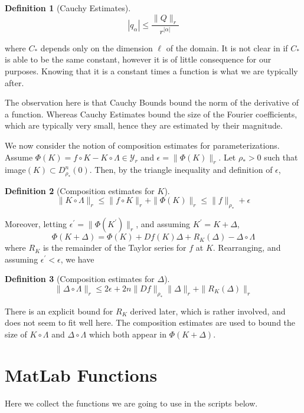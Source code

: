 \documentclass{article}
\newcommand{\Y}{\mathcal{Y}}
\theoremstyle{plain}
\newtheorem*{dfn}{Definition}
\theoremstyle{remark}
\begin{document}
\begin{dfn}[Cauchy Estimates]
\[
|q_\alpha| \leq \frac{\| Q \|_r}{r^{|\alpha|}}
\]
\end{dfn}

where $C_*$ depends only on the dimension $\ell$ of the domain. 
It is not clear in \cite{parampaper} if $C_*$ is able to be the same constant, however it is of little consequence for our purposes. 
Knowing that it is a constant times a function is what we are typically after. 

The observation here is that Cauchy Bounds bound the norm of the derivative of a function. 
Whereas Cauchy Estimates bound the size of the Fourier coefficients, which are typically very small, hence they are estimated by their magnitude. 

We now consider the notion of composition estimates for parameterizations. 
Assume $\Phi(K) = f \circ K - K \circ \Lambda \in \Y_r$ and $\epsilon = \| \Phi(K) \|_r$. 
Let $\rho_* > 0$ such that image$(K) \subset D_{\rho_*}^n(0)$. 
Then, by the triangle inequality and definition of $\epsilon$,
\begin{dfn}[Composition estimates for $K$]
\[
\| K \circ \Lambda \|_r \leq \| f \circ K \|_r + \| \Phi(K) \| _r \leq \| f \|_{\rho_*} + \epsilon
\]
\end{dfn}
Moreover, letting $\epsilon^\prime = \| \Phi(K^\prime)\|_{r}$, and assuming $K^\prime = K + \Delta$,
\[
\Phi(K + \Delta) = \Phi(K) + Df(K)\Delta + R_K(\Delta) - \Delta \circ \Lambda
\]
where $R_K$ is the remainder of the Taylor series for $f$ at $K$. 
Rearranging, and assuming $\epsilon^\prime < \epsilon$, we have
\begin{dfn}[Composition estimates for $\Delta$]
\[ 
\| \Delta \circ \Lambda \|_r \leq  2 \epsilon + 2n \| Df\|_{\rho_*} \| \Delta \|_r + \| R_K(\Delta)\|_r
\]
\end{dfn}
There is an explicit bound for $R_K$ derived later, which is rather involved, and does not seem to fit well here. 
The composition estimates are used to bound the size of $K \circ \Lambda$ and $\Delta \circ \Lambda$ which both appear in $\Phi(K + \Delta)$. 


\section{MatLab Functions}%

Here we collect the functions we are going to use in the scripts below. 
\end{document}
